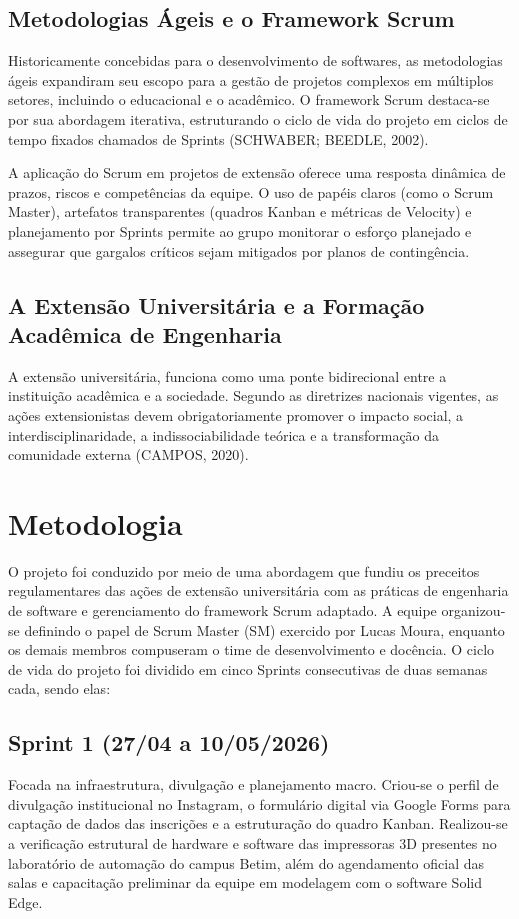 \documentclass[12pt,a4paper]{article}
\begin{document}
\subsection{Metodologias Ágeis e o Framework Scrum}
Historicamente concebidas para o desenvolvimento de softwares, as metodologias ágeis expandiram seu escopo para a gestão de projetos complexos em múltiplos setores, incluindo o educacional e o acadêmico. O framework Scrum destaca-se por sua abordagem iterativa, estruturando o ciclo de vida do projeto em ciclos de tempo fixados chamados de Sprints (SCHWABER; BEEDLE, 2002).

A aplicação do Scrum em projetos de extensão oferece uma resposta dinâmica de prazos, riscos e competências da equipe. O uso de papéis claros (como o Scrum Master), artefatos transparentes (quadros Kanban e métricas de Velocity) e planejamento por Sprints permite ao grupo monitorar o esforço planejado e assegurar que gargalos críticos sejam mitigados por planos de contingência.

\subsection{A Extensão Universitária e a Formação Acadêmica de Engenharia}
A extensão universitária, funciona como uma ponte bidirecional entre a instituição acadêmica e a sociedade. Segundo as diretrizes nacionais vigentes, as ações extensionistas devem obrigatoriamente promover o impacto social, a interdisciplinaridade, a indissociabilidade teórica e a transformação da comunidade externa (CAMPOS, 2020).

\section{Metodologia}
O projeto foi conduzido por meio de uma abordagem que fundiu os preceitos regulamentares das ações de extensão universitária com as práticas de engenharia de software e gerenciamento do framework Scrum adaptado. A equipe organizou-se definindo o papel de Scrum Master (SM) exercido por Lucas Moura, enquanto os demais membros compuseram o time de desenvolvimento e docência. O ciclo de vida do projeto foi dividido em cinco Sprints consecutivas de duas semanas cada, sendo elas:

\subsection{Sprint 1 (27/04 a 10/05/2026)}
Focada na infraestrutura, divulgação e planejamento macro. Criou-se o perfil de divulgação institucional no Instagram, o formulário digital via Google Forms para captação de dados das inscrições e a estruturação do quadro Kanban. Realizou-se a verificação estrutural de hardware e software das impressoras 3D presentes no laboratório de automação do campus Betim, além do agendamento oficial das salas e capacitação preliminar da equipe em modelagem com o software Solid Edge.
\end{document}
